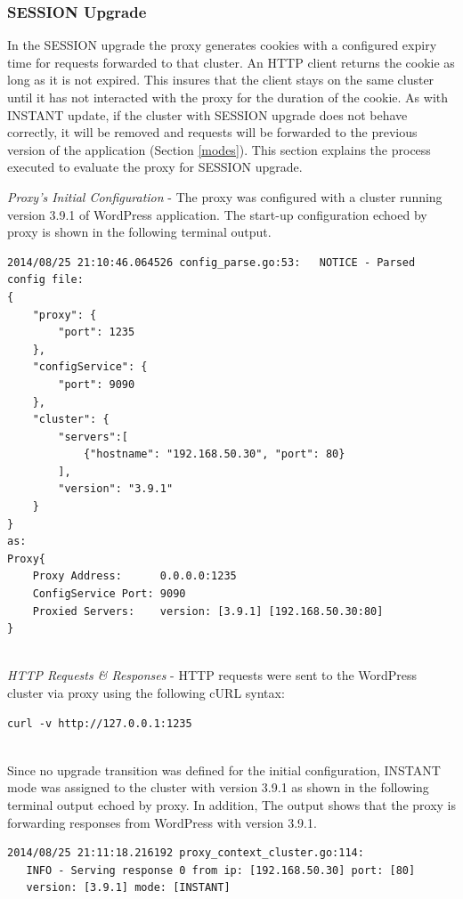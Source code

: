 \documentclass[a4paper,11pt,twoside]{report}
\begin{document}
\subsubsection*{SESSION Upgrade}
In the SESSION upgrade the proxy generates cookies with a configured expiry time for requests forwarded to that cluster. An HTTP client returns the cookie as long as it is not expired. This insures that the client stays on the same cluster until it has not interacted with the proxy for the duration of the cookie. As with INSTANT update, if the cluster with SESSION upgrade does not behave correctly, it will be removed and requests will be forwarded to the previous version of the application (Section \ref{modes}). This section explains the process executed to evaluate the proxy for SESSION upgrade.\medskip

\noindent
\textit{Proxy's Initial Configuration} - The proxy was configured with a cluster running version 3.9.1 of WordPress application. The start-up configuration echoed by proxy is shown in the following terminal output.\smallskip

\begin{lstlisting}[language=terminal]
2014/08/25 21:10:46.064526 config_parse.go:53:   NOTICE - Parsed config file:
{
    "proxy": {
        "port": 1235
    },
    "configService": {
        "port": 9090
    },
    "cluster": {
        "servers":[
            {"hostname": "192.168.50.30", "port": 80}
        ],
        "version": "3.9.1"
    }
}
as:
Proxy{
	Proxy Address:      0.0.0.0:1235
	ConfigService Port: 9090
	Proxied Servers:    version: [3.9.1] [192.168.50.30:80]
}
\end{lstlisting}

\noindent \\
\textit{HTTP Requests \& Responses} - HTTP requests were sent to the WordPress cluster via proxy using the following cURL syntax:\smallskip  

\begin{lstlisting}[language=terminal]
curl -v http://127.0.0.1:1235
\end{lstlisting} 

\noindent\\Since no upgrade transition was defined for the initial configuration, INSTANT mode was assigned to the cluster with version 3.9.1 as shown in the following terminal output echoed by proxy. In addition, The output shows that the proxy is forwarding responses from WordPress with version 3.9.1. \smallskip

\begin{lstlisting}[language=terminal] 
2014/08/25 21:11:18.216192 proxy_context_cluster.go:114:     
   INFO - Serving response 0 from ip: [192.168.50.30] port: [80] 
   version: [3.9.1] mode: [INSTANT]
\end{lstlisting} 
\end{document}

